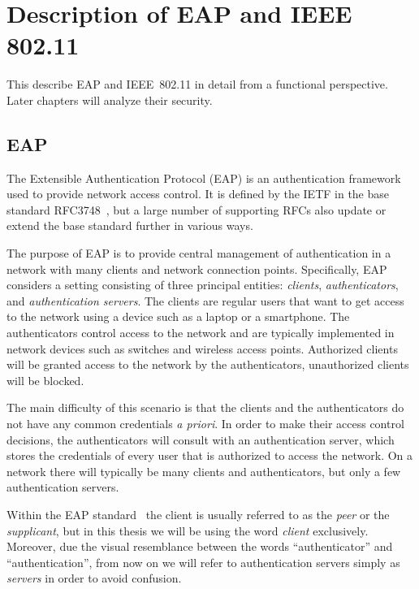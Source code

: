 \chapter{Description of EAP and IEEE 802.11}\label{sec:descriptions:EAP_&_802.11}


\begingroup
\hypersetup{linkcolor=black}
\minitoc
\endgroup

This  describe EAP and IEEE~802.11 in detail from a functional perspective.
Later chapters will analyze their security.

\section{EAP}\label{sec:EAP:description}

The Extensible Authentication Protocol (EAP) is an authentication framework used to provide network access control. 
It is defined by the IETF in the base standard RFC3748~\cite{IETF:RFC3748:EAP},
but a large number of supporting RFCs also update or extend the base standard further in various ways. 

The purpose of EAP is to provide central management of authentication in a network with many clients and  network connection points.
Specifically,
EAP considers a setting consisting of three principal entities: 
\emph{clients}, \emph{authenticators}, and \emph{authentication servers}. 
The clients are regular users that want to get access to the network using a device such as a laptop or a smartphone.
The authenticators control access to the network and are typically implemented in network devices such as switches and wireless access points.
Authorized clients will be granted access to the network by the authenticators,
unauthorized clients will be blocked.


The main difficulty of this scenario is that the clients and the authenticators do not have any common credentials \emph{a priori}.
In order to make their access control decisions,
the authenticators will consult with an authentication server,
which stores the credentials of every user that is authorized to access the network.
On a network there will typically be many clients and authenticators,
but only a few  authentication servers.

\begin{remark}\label{remark:EAP&802.11:authenticator_vs_authentication}
Within the EAP standard~\cite{IETF:RFC3748:EAP} the client is usually referred to as the \emph{peer} or the \emph{supplicant},
but in this thesis we will be using the word \emph{client} exclusively.
Moreover,
due the visual resemblance between the words ``authenticator'' and ``authentication'',
from now on we will refer to authentication servers simply as \emph{servers} in order to avoid confusion. 
\end{remark}


